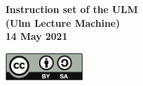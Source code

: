 \begin{titlepage}
   \begin{flushright}
      {\Huge \bfseries
	 Instruction set of the ULM\\
	 (Ulm Lecture Machine) \\
	 14 May 2021 \\
      }

      \vspace*{\fill}

      \href{https://creativecommons.org/licenses/by-sa/4.0/}
      {\includegraphics[width=3cm]{by-sa.pdf}}
      \hspace*{\fill}
      {\huge
      }
   \end{flushright}
\end{titlepage}
